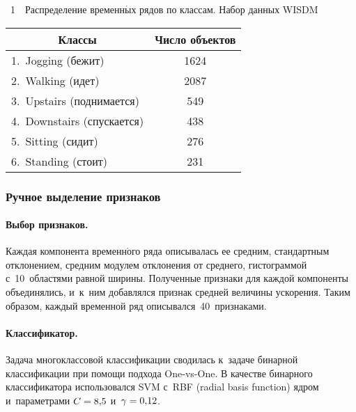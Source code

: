 \begin{multicols}{2}
\vspace*{12pt}

\noindent
{{\tablename~1}\ \ \small{Распределение временн$\acute{\mbox{ы}}$х рядов по классам. Набор данных
  WISDM}}

{\small
\begin{center}
   \tabcolsep=14pt
  \begin{tabular}{|l|c|}
    \hline
    \multicolumn{1}{|c|}{Классы} & Число объектов\\
    \hline
    1.\ Jogging (бежит) &  1624\hphantom{9}\\
    2.\ Walking (идет) &  2087\hphantom{9}\\
    3.\ Upstairs (поднимается)& 549\\
    4.\ Downstairs (спускается)& 438\\
    5.\ Sitting (сидит) & 276\\
    6.\ Standing (стоит)& 231\\
     \hline
  \end{tabular}
  \end{center}}
  
  \addtocounter{table}{1}

\subsubsection{Ручное выделение признаков}

\paragraph*{Выбор признаков.}
Каждая компонента вре\-мен\-н$\acute{\mbox{о}}$\-го ряда описывалась ее средним, 
стандартным отклонением, средним модулем отклонения от среднего, гистограммой 
с~10~областями равной \mbox{ширины}.
Полученные признаки для каждой компоненты объединялись, и~к~ним добавлялся признак 
средней величины ускорения.
Таким образом, каждый временной ряд описывался~40~признаками.


\vspace*{-12pt}

\paragraph*{Классификатор.}
Задача многоклассовой классификации сводилась к~задаче бинарной 
классификации при помощи подхода One-vs-One.
В качестве бинарного классификатора использовался SVM с~RBF (radial basis function)
яд\-ром 
и~па\-ра\-мет\-ра\-ми $C\hm=8{,}5$ и~$\gamma\hm=0{,}12$.


\end{multicols}
